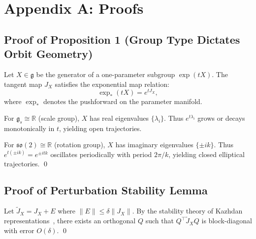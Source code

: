 \section*{Appendix A: Proofs}
\label{sec:appendix_theory}

\subsection*{Proof of Proposition 1 (Group Type Dictates Orbit Geometry)}

\begin{Proof}
Let $X \in \mathfrak{g}$ be the generator of a one-parameter subgroup $\exp(tX)$.
The tangent map $J_X$ satisfies the exponential map relation:
\begin{equation}
    \exp_*(tX) = e^{t J_X},
\end{equation}
where $\exp_*$ denotes the pushforward on the parameter manifold.

For $\mathfrak{g}_s \cong \mathbb{R}$ (scale group), $X$ has real eigenvalues $\{\lambda_i\}$.
Thus $e^{t\lambda_i}$ grows or decays monotonically in $t$, yielding open trajectories.

For $\mathfrak{so}(2) \cong \mathbb{R}$ (rotation group), $X$ has imaginary eigenvalues $\{\pm ik\}$.
Thus $e^{t(\pm ik)} = e^{\pm itk}$ oscillates periodically with period $2\pi/k$, yielding closed elliptical trajectories.
\qed
\end{Proof}

\subsection*{Proof of Perturbation Stability Lemma}

\begin{Proof}
Let $\tilde{J}_X = J_X + E$ where $\|E\| \le \delta \|J_X\|$.
By the stability theory of Kazhdan representations~\citep{kazhdan2012lovasz}, there exists an orthogonal $Q$ such that $Q^\top \tilde{J}_X Q$ is block-diagonal with error $O(\delta)$.
\qed
\end{Proof}
